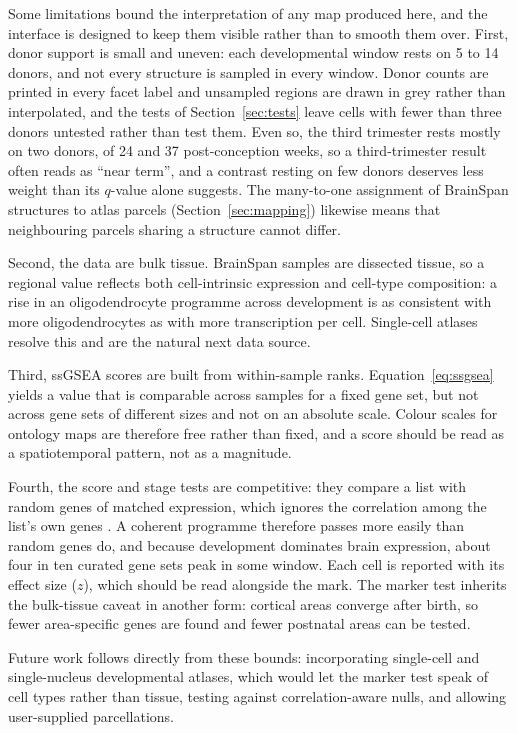 \documentclass[pdflatex,sn-basic]{sn-jnl}
\begin{document}
Some limitations bound the interpretation of any map produced here, and the
interface is designed to keep them visible rather than to smooth them over.
First, donor support is small and uneven: each developmental window rests on 5
to 14 donors, and not every structure is sampled in every window. Donor counts
are printed in every facet label and unsampled regions are drawn in grey rather
than interpolated, and the tests of Section~\ref{sec:tests} leave cells with
fewer than three donors untested rather than test them. Even so, the third
trimester rests mostly on two donors, of 24 and 37 post-conception weeks, so a
third-trimester result often reads as ``near term'', and a contrast resting on
few donors deserves less weight than its $q$-value alone suggests. The many-to-one assignment of
BrainSpan structures to atlas parcels (Section~\ref{sec:mapping}) likewise means
that neighbouring parcels sharing a structure cannot differ.

Second, the data are bulk tissue. BrainSpan samples are dissected tissue, so a
regional value reflects both cell-intrinsic expression and cell-type
composition: a rise in an oligodendrocyte programme across development is as
consistent with more oligodendrocytes as with more transcription per cell.
Single-cell atlases resolve this and are the natural next data source.

Third, ssGSEA scores are built from within-sample ranks. Equation~\ref{eq:ssgsea}
yields a value that is comparable across samples for a fixed gene set, but not
across gene sets of different sizes and not on an absolute scale. Colour scales
for ontology maps are therefore free rather than fixed, and a score should be
read as a spatiotemporal pattern, not as a magnitude.

Fourth, the score and stage tests are competitive: they compare a list with
random genes of matched expression, which ignores the correlation among the
list's own genes \citep{Goeman2007,Wu2012}. A coherent programme therefore
passes more easily than random genes do, and because development dominates
brain expression, about four in ten curated gene sets peak in some window. Each
cell is reported with its effect size ($z$), which should be read alongside the
mark. The marker test inherits the bulk-tissue caveat in another form: cortical
areas converge after birth, so fewer area-specific genes are found and fewer
postnatal areas can be tested.

Future work follows directly from these bounds: incorporating single-cell and
single-nucleus developmental atlases, which would let the marker test speak of
cell types rather than tissue, testing against correlation-aware nulls, and
allowing user-supplied parcellations.
\end{document}
